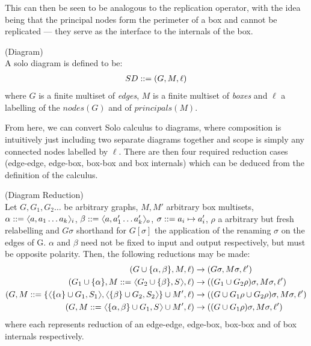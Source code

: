     This can then be seen to be analogous to the replication operator, with the idea being that the principal nodes form the perimeter of a box and cannot be replicated --- they serve as the interface to the internals of the box.


    \begin{definition}{(Diagram)\\}
        A solo diagram is defined to be:
        \begin{align*}
            SD ::= (G, M, \ell)
        \end{align*}
        where $G$ is a finite multiset of \textit{edges}, $M$ is a finite multiset of \textit{boxes} and $\ell$ a labelling of the $nodes(G)$ and of $principals(M)$.
    \end{definition}
    From here, we can convert Solo calculus to diagrams, where composition is intuitively just including two separate diagrams together and scope is simply any connected nodes labelled by $\ell$.
    There are then four required reduction cases (edge-edge, edge-box, box-box and box internals) which can be deduced from the definition of the calculus.


    \begin{definition}{(Diagram Reduction)\\}
        Let $G, G_1, G_2 \ldots$ be arbitrary graphs, $M, M'$ arbitrary box multisets, $\alpha \defeq \langl a, a_1 \ldots a_k\rangl_i$, $\beta \defeq \langl a, a_1' \ldots a_k'\rangl_o$, $\sigma ::= a_i \mapsto a_i'$, $\rho$ a arbitrary but fresh relabelling and $G\sigma$ shorthand for $G[\sigma]$ the application of the renaming $\sigma$ on the edges of G.
        $\alpha$ and $\beta$ need not be fixed to input and output respectively, but must be opposite polarity.
        Then, the following reductions may be made:
        \begin{align*}
            (G \cup \{\alpha, \beta\}, M, \ell)                                                                             & \rightarrow (G\sigma, M\sigma, \ell') \\
            (G_1 \cup \{\alpha\}, M \defeq \langl G_2 \cup \{\beta\}, S\rangl, \ell)                                        & \rightarrow ((G_1 \cup G_2\rho)\sigma, M\sigma, \ell') \\
            (G, M \defeq \{\langl \{ \alpha \} \cup G_1, S_1\rangl,\langl \{ \beta \} \cup G_2, S_2\rangl\} \cup M', \ell)    & \rightarrow ((G \cup G_1\rho \cup G_2\rho)\sigma, M\sigma, \ell') \\
            (G, M \defeq \langl \{ \alpha, \beta \} \cup G_1, S\rangl \cup M', \ell)                                          & \rightarrow ((G \cup G_1\rho)\sigma, M\sigma, \ell')
        \end{align*}
        where each represents reduction of an edge-edge, edge-box, box-box and of box internals respectively.
    \end{definition}


